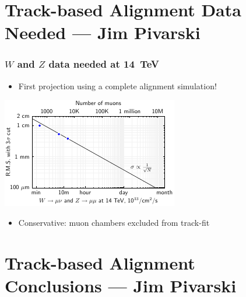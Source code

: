 \documentclass[compress]{beamer}
\begin{document}
\section*{Track-based Alignment Data Needed --- Jim Pivarski}

\begin{frame}
  \frametitle{$W$ and $Z$ data needed at 14~TeV}
  \begin{itemize}
    \item First projection using a complete alignment simulation!
  \end{itemize}

  \vspace{-0.5 cm}
  \begin{center}
    \includegraphics[width=0.85\linewidth]{time_projection}
  \end{center}

  \vspace{-0.5 cm}
  \begin{itemize}
    \item Conservative: muon chambers excluded from track-fit
  \end{itemize}
\end{frame}

\section*{Track-based Alignment Conclusions --- Jim Pivarski}
\end{document}

